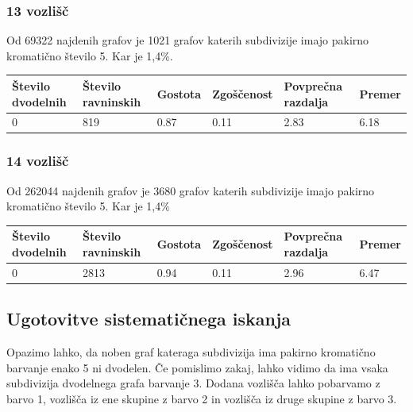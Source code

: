 \documentclass[11pt,a4paper,titlepage]{article}
\begin{document}
\subsubsection{13 vozlišč}
Od 69322 najdenih grafov je 1021 grafov katerih subdivizije imajo pakirno kromatično število 5. Kar je 1,4\%.

\begin{table}[H]
	\begin{tabular}{|l|l|l|l|l|l|}
		\hline
		Število dvodelnih	& Število ravninskih  & Gostota  & Zgoščenost & Povprečna razdalja & Premer \\ \hline
		0 & 819 & 0.87 & 0.11 & 2.83 & 6.18 \\ \hline
	\end{tabular}
\end{table}
\subsubsection{14 vozlišč}
Od 262044 najdenih grafov je 3680 grafov katerih subdivizije imajo pakirno kromatično število 5. Kar je 1,4\%
\begin{table}[H]
	\begin{tabular}{|l|l|l|l|l|l|}
		\hline
		Število dvodelnih	& Število ravninskih  & Gostota  & Zgoščenost & Povprečna razdalja & Premer \\ \hline
		0 & 2813 & 0.94 & 0.11 & 2.96 & 6.47 \\ \hline
	\end{tabular}
\end{table}

\subsection{Ugotovitve sistematičnega iskanja}
Opazimo lahko, da noben graf kateraga subdivizija ima pakirno kromatično barvanje enako 5 ni dvodelen. Če pomislimo zakaj, lahko vidimo da ima vsaka subdivizija dvodelnega grafa barvanje 3. Dodana vozlišča lahko pobarvamo z barvo 1, vozlišča iz ene skupine z barvo 2 in vozlišča iz druge skupine z barvo 3.
\end{document}
